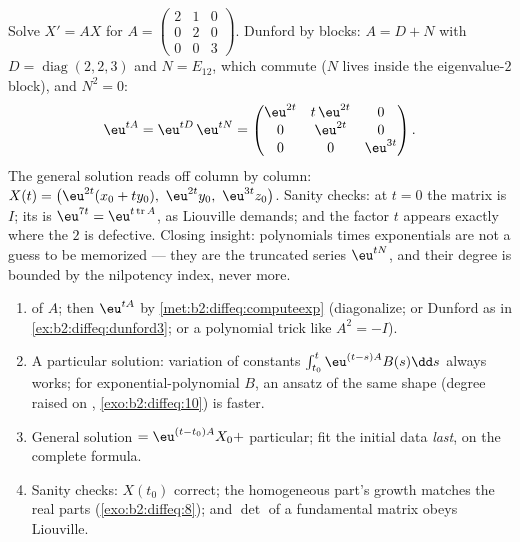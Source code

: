 \begin{example}\label{ex:b2:diffeq:dunford3}
Solve $X' = AX$ for $A = \begin{pmatrix} 2 & 1 & 0\\ 0 & 2 &
0\\ 0 & 0 & 3\end{pmatrix}$. Dunford by blocks: $A = D + N$
with $D = \operatorname{diag}(2, 2, 3)$ and $N = E_{12}$, which
commute ($N$ lives inside the eigenvalue-$2$ block), and $N^2 =
0$:
\[
\eu^{tA} = \eu^{tD}\,\eu^{tN}
= \begin{pmatrix}
\eu^{2t} & t\,\eu^{2t} & 0\\
0 & \eu^{2t} & 0\\
0 & 0 & \eu^{3t}
\end{pmatrix} .
\]
The general solution reads off column by column: $X(t) =
\bigl(\eu^{2t}(x_0 + ty_0),\ \eu^{2t}y_0,\
\eu^{3t}z_0\bigr)$. Sanity checks: at $t = 0$ the matrix is
$I$; its  is $\eu^{7t} =
\eu^{t\operatorname{tr}A}$, as Liouville demands; and the
factor $t$ appears exactly where the  $2$ is
defective. Closing insight: polynomials times exponentials are
not a guess to be memorized --- they are the truncated series
$\eu^{tN}$, and their degree is bounded by the nilpotency
index, never more.
\end{example}

\begin{method}[Solving $X' = AX + B(t)$, start to finish]\label{met:b2:diffeq:solvelinear}
\begin{enumerate}
  \item {} of $A$; then $\eu^{tA}$ by
        \cref{met:b2:diffeq:computeexp} (diagonalize; or
        Dunford as in \cref{ex:b2:diffeq:dunford3}; or a
        polynomial trick like $A^2 = -I$).
  \item A particular solution: variation of constants
        $\int_{t_0}^t\eu^{(t-s)A}B(s)\dd s$ always works;
        for exponential-polynomial $B$, an ansatz of the same
        shape (degree raised on ,
        \cref{exo:b2:diffeq:10}) is faster.
  \item General solution $= \eu^{(t-t_0)A}X_0 +$ particular;
        fit the initial data \emph{last}, on the complete
        formula.
  \item Sanity checks: $X(t_0)$ correct; the homogeneous part's
        growth matches the  real parts
        (\cref{exo:b2:diffeq:8}); and $\det$ of a fundamental
        matrix obeys Liouville.
\end{enumerate}
\end{method}

